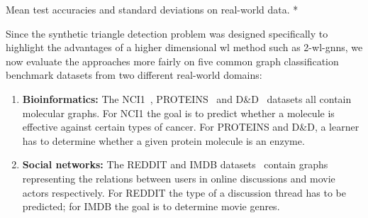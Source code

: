 \begin{table}[ht]
	\caption[Mean test accuracies and standard deviations on real-world data.]{
		Mean test accuracies and standard deviations on real-world data.
		\hfill\textcolor{t_darkgreen}{*}\,
	}\label{tbl:eval:real}
	\centering
\end{table}
Since the synthetic triangle detection problem was designed specifically to highlight the advantages of a higher dimensional \ac{wl} method such as 2-\ac{wl}-\acsp{gnn}, we now evaluate the approaches more fairly on five common graph classification benchmark datasets from two different real-world domains:
\begin{enumerate}[label={\textbf{\arabic*.}}]
	\item \textbf{Bioinformatics:}
		The NCI1~\cite{Shervashidze2011}, PROTEINS~\cite{Borgwardt2005a} and D\&D~\cite{Dobson2003} datasets all contain molecular graphs.
		For NCI1 the goal is to predict whether a molecule is effective against certain types of cancer.
		For PROTEINS and D\&D, a learner has to determine whether a given protein molecule is an enzyme.
	\item \textbf{Social networks:}
		The REDDIT and IMDB datasets~\cite{Yanardag2015} contain graphs representing the relations between users in online discussions and movie actors respectively.
		For REDDIT the type of a discussion thread has to be predicted; for IMDB the goal is to determine movie genres.
\end{enumerate}
